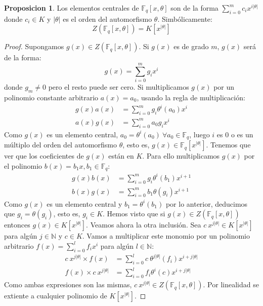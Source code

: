 \documentclass[a4paper,11pt]{article}
\numberwithin{equation}{section}
\theoremstyle{definition} %
\newtheorem{proposicion}{Proposicion}[section]
\newcommand{\Fq}{\mathbb{F}_q}
\newcommand{\Fqxo}{\Fq[x, \theta]}
\begin{document}
    \begin{proposicion}
        Los elementos centrales de $\Fqxo$ son de la forma
        $\sum_{i = 0}^{m}c_i x^{i |\theta|}$ donde $c_i \in K$ y $|\theta|$ es el orden del automorfismo $\theta$. Simbólicamente:
        $$
            Z(\Fqxo) = K[x^{|\theta|}]
        $$
    \end{proposicion}
    \begin{proof}
        Supongamos $g(x) \in Z(\Fqxo)$. Si $g(x)$ es de grado $m$, $g(x)$ será de la forma:
        $$
            g(x) = \sum_{i = 0}^{m}g_i x^i
        $$
        donde $g_m \neq 0$ pero el resto puede ser cero. Si multiplicamos $g(x)$ por un polinomio constante arbitrario $a(x) = a_0$, usando la regla de multiplicación:
        \begin{align*}
            g(x) a(x) &= \sum_{i = 0}^{m}g_i \theta^i(a_0) x^i \\
            a(x) g(x) &= \sum_{i = 0}^{m}a_0 g_i x^i
        \end{align*}
        Como $g(x)$ es un elemento central, $a_0 = \theta^i(a_0)\ \forall a_0 \in \Fq$, luego $i$ es $0$ o es un múltiplo del orden del automorfismo $\theta$, esto es, $g(x) \in \Fq[x^{|\theta|}]$. Tenemos que ver que los coeficientes de $g(x)$ están en $K$. Para ello multiplicamos $g(x)$ por el polinomio $b(x) = b_1 x, b_1 \in \Fq$:
        \begin{align*}
            g(x) b(x) &= \sum_{i = 0}^{m}g_{i} \theta^{i}(b_1) x^{i+1} \\
            b(x) g(x) &= \sum_{i = 0}^{m}b_1 \theta(g_{i}) x^{i+1}
        \end{align*}
        Como $g(x)$ es un elemento central y $b_1 = \theta^{i}(b_1)$ por lo anterior, deducimos que $g_{i} = \theta(g_{i})$, esto es, $g_i \in K$.
        Hemos visto que si $g(x) \in Z(\Fqxo)$ entonces $g(x) \in K[x^{|\theta|}]$. Veamos ahora la otra inclusión. Sea $c\ x^{j|\theta|} \in K[x^{|\theta|}]$ para algún $j \in \mathbb{N}$ y $c \in K$. Vamos a multiplicar este monomio por un polinomio arbitrario $f(x) = \sum_{i = 0}^{l}f_i x^i$ para algún $l \in \mathbb{N}$:
        \begin{align*}
            c\ x^{j|\theta|} \times f(x) &=
                \sum_{i = 0}^{l}c\ \theta^{j|\theta|}(f_{i}) x^{i+j|\theta|} \\
            f(x) \times c\ x^{j|\theta|} &=
                \sum_{i = 0}^{l}f_{i} \theta^{i}(c) x^{i+j|\theta|}
        \end{align*}
        Como ambas expresiones son las mismas, $c\ x^{j|\theta|} \in Z(\Fqxo)$. Por linealidad se extiente a cualquier polinomio de $K[x^{|\theta|}]$.
    \end{proof}
\end{document}

